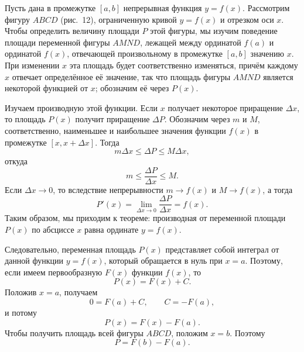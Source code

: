 \begin{rusblock}
Пусть дана в промежутке $[a,b]$ непрерывная функция $y=f(x)$. Рассмотрим фигуру $ABCD$ (рис.~12), ограниченную кривой $y=f(x)$ и отрезком оси $x$. Чтобы определить величину площади $P$ этой фигуры, мы изучим поведение площади переменной фигуры $AMND$, лежащей между ординатой $f(a)$ и ординатой $f(x)$, отвечающей произвольному в промежутке $[a,b]$ значению $x$. При изменении $x$ эта площадь будет соответственно изменяться, причём каждому $x$ отвечает определённое её значение, так что площадь фигуры $AMND$ является некоторой функцией от $x$; обозначим её через $P(x)$.

Изучаем производную этой функции. Если $x$ получает некоторое приращение $\Delta x$, то площадь $P(x)$ получит приращение $\Delta P$. Обозначим через $m$ и $M$, соответственно, наименьшее и наибольшее значения функции $f(x)$ в промежутке $[x,x+\Delta x]$. Тогда
\[
m\Delta x\le\Delta P\le M\Delta x,
\]
откуда
\[
m\le\frac{\Delta P}{\Delta x}\le M.
\]
Если $\Delta x\to0$, то вследствие непрерывности $m\to f(x)$ и $M\to f(x)$, а тогда
\[
P'(x)=\lim_{\Delta x\to0}\frac{\Delta P}{\Delta x}=f(x).
\]
Таким образом, мы приходим к теореме: производная от переменной площади $P(x)$ по абсциссе $x$ равна ординате $y=f(x)$.

Следовательно, переменная площадь $P(x)$ представляет собой интеграл от данной функции $y=f(x)$, который обращается в нуль при $x=a$. Поэтому, если имеем первообразную $F(x)$ функции $f(x)$, то
\[
P(x)=F(x)+C.
\]
Положив $x=a$, получаем
\[
0=F(a)+C,\qquad C=-F(a),
\]
и потому
\[
P(x)=F(x)-F(a).
\]
Чтобы получить площадь всей фигуры $ABCD$, положим $x=b$. Поэтому
\[
\boxed{P=F(b)-F(a)}.
\]
\end{rusblock}
